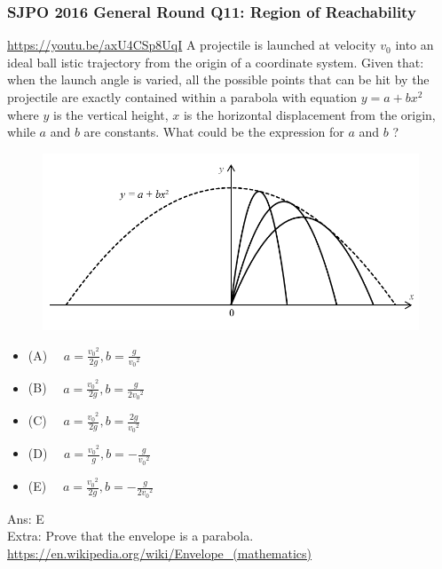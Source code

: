 \documentclass{article}
\begin{document}
\begin{samepage}
\subsubsection{SJPO 2016 General Round Q11: Region of Reachability}
\url{https://youtu.be/axU4CSp8UqI}
A projectile is launched at velocity $v_0$ into an ideal ball istic trajectory from the origin of a coordinate system. Given that: when the launch angle is varied, all the possible points that can be hit by the projectile are exactly contained within a parabola with equation $y=a+b x^2$ where $y$ is the vertical height, $x$ is the horizontal displacement from the origin, while $a$ and $b$ are constants. What could be the expression for $a$ and $b$ ?\\
 \begin{figure} 
\includegraphics[width=\linewidth]{images/sjpo2016q11.png}
\end{figure}
\begin{itemize}
\item[](A) $\quad a=\frac{v_0{ }^2}{2 g}, b=\frac{g}{v_0{ }^2}$
\item[](B) $\quad a=\frac{v_0{ }^2}{2 g}, b=\frac{g}{2 v_0{ }^2}$
\item[](C) $\quad a=\frac{v_0{ }^2}{2 g}, b=\frac{2 g}{v_0{ }^2}$
\item[](D) $\quad a=\frac{v_0{ }^2}{g}, b=-\frac{g}{v_0{ }^2}$
\item[](E) $\quad a=\frac{v_0{ }^2}{2 g}, b=-\frac{g}{2 v_0{ }^2}$
\end{itemize}
Ans: \ifpaper E \fi \\[10pt]
Extra: Prove that the envelope is a parabola. \url{https://en.wikipedia.org/wiki/Envelope_(mathematics)}
\end{samepage}
\end{document}
